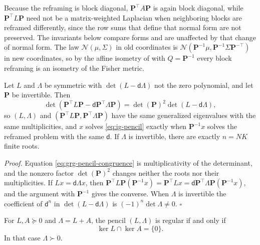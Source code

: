 Because the reframing is block diagonal, \(\mathbf P^\top A\mathbf P\) is again block diagonal,
while \(\mathbf P^\top L\mathbf P\) need not be a matrix-weighted Laplacian when neighboring blocks
are reframed differently, since the row sums that define that normal form are not
preserved. The invariants below compare forms and are unaffected by that change of
normal form. The law \(\mathcal N(\mu,\Sigma)\) in old coordinates is
\(\mathcal N(\mathbf P^{-1}\mu,\mathbf P^{-1}\Sigma \mathbf P^{-\top})\) in new coordinates, so by the
affine isometry of  with \(Q=\mathbf P^{-1}\) every block
reframing is an isometry of the Fisher metric.

\label{prop:ig-generalized-spectrum-invariance}
Let \(L\) and \(\Lambda\) be symmetric with \(\det(L-\mathsf d\Lambda)\) not the zero
polynomial, and let \(\mathbf P\) be invertible. Then
\begin{equation}
\det\left(\mathbf P^\top L\mathbf P-\mathsf d\mathbf P^\top\Lambda \mathbf P\right)
=\det(\mathbf P)^2\det(L-\mathsf d\Lambda),
\label{eq:grg-pencil-congruence}
\end{equation}
so \((L,\Lambda)\) and \((\mathbf P^\top L\mathbf P,\mathbf P^\top\Lambda \mathbf P)\) have the same generalized
eigenvalues with the same multiplicities, and \(x\) solves \eqref{eq:ig-pencil}
exactly when \(\mathbf P^{-1}x\) solves the reframed problem with the same \(\mathsf d\). If
\(\Lambda\) is invertible, there are exactly \(n=NK\) finite roots.

\noindent\emph{Proof.}
Equation \eqref{eq:grg-pencil-congruence} is multiplicativity of the determinant,
and the nonzero factor \(\det(\mathbf P)^2\) changes neither the roots nor their
multiplicities. If \(Lx=\mathsf d\Lambda x\), then
\(\mathbf P^\top L\mathbf P(\mathbf P^{-1}x)=\mathbf P^\top Lx=\mathsf d\mathbf P^\top\Lambda \mathbf P(\mathbf P^{-1}x)\), and the argument
with \(\mathbf P^{-1}\) gives the converse. When \(\Lambda\) is invertible the coefficient of
\(\mathsf d^{n}\) in \(\det(L-\mathsf d\Lambda)\) is \((-1)^n\det\Lambda\neq0\).
\hfill$\square$

For \(L,A\succeq0\) and \(\Lambda=L+A\), the pencil \((L,\Lambda)\) is regular if and
only if
\begin{equation}
\ker L\cap\ker A=\{0\}.
\label{eq:grg-regularity}
\end{equation}
In that case \(\Lambda\succ0\). 

